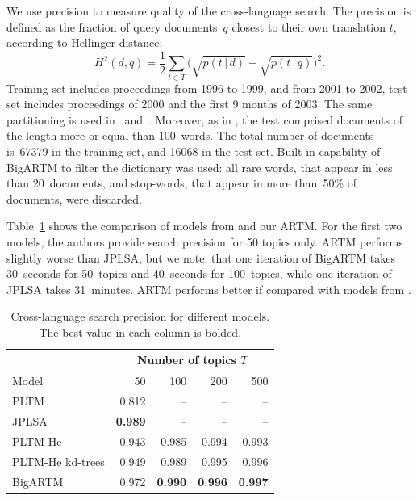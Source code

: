\documentclass{sig-alternate-2013}
\newcommand{\cond}{\mspace{3mu}{|}\mspace{3mu}}
\begin{document}
We use precision to measure quality of the cross-language search.
The precision is defined as the fraction of query documents~$q$ closest to their own translation $t$,
according to Hellinger distance:
\[
    H^2(d,q)= \frac12 \sum_{t\in T} \bigl( \sqrt{p(t\cond d)} - \sqrt{p(t\cond q)} \bigr)^2 .
\]
Training set includes proceedings from 1996 to 1999, and from 2001 to 2002,
test set includes proceedings of 2000 and the first 9 months of 2003.
The same partitioning is used in~\cite{platt10translingual} and~\cite{mimno12sparse}.
Moreover, as in \cite{mimno09polylingual,mimno12sparse},
the test comprised documents of the length more or equal than 100~words.
The total number of documents is~67379 in the training set, and 16068 in the test set.
Built-in capability of BigARTM to filter the dictionary was used:
all rare words, that appear in less than 20~documents, and stop-words, that appear in more than~50\% of documents, were discarded.

Table~\ref{tab:cross-lingual} shows the comparison of
models from \cite{mimno09polylingual,platt10translingual,mimno12sparse} and our ARTM.
For the first two models, the authors provide search precision for 50 topics only.
ARTM performs slightly worse than JPLSA, but we note, that
one iteration of BigARTM takes 30~seconds for 50~topics and 40~seconds for 100~topics,
while one iteration of JPLSA takes 31~minutes.
ARTM performs better if compared with models from \cite{mimno12sparse}.

\begin{table}[t]
\caption{Cross-language search precision for different models. The best value in each column is bolded.}
\label{tab:cross-lingual}
\medskip\centering\tabcolsep=4.3pt
\begin{tabular}{l|rrrr}
\hline
	& \multicolumn{4}{c}{Number of topics $T$} \\
\hline
Model &	50	&100	&200	&500 \\
\hline
PLTM \cite{mimno09polylingual}          &0.812  &  --  &  --  &  --  \\
JPLSA \cite{platt10translingual}        &\textbf{0.989}  &  --  &  --  &  --  \\
PLTM-He \cite{mimno12sparse}            &0.943  &0.985 &0.994 &0.993 \\
PLTM-He kd-trees \cite{mimno12sparse}	&0.949	&0.989 &0.995 &0.996 \\
\hline
BigARTM	                                &0.972	&\textbf{0.990} &\textbf{0.996} &\textbf{0.997} \\
\hline
\end{tabular}
\end{table}
\end{document}
